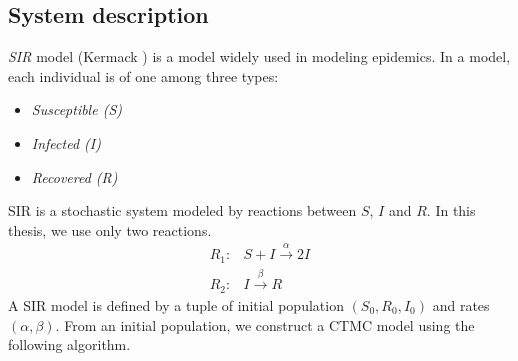 \subsection{System description}
\textit{SIR} model (Kermack \cite{kermack1927contribution}) is a model widely used in modeling
epidemics. In a  model, each individual is of one among three types:
\begin{itemize}
    \item \textit{Susceptible (S)}
    \item \textit{Infected (I)}
    \item \textit{Recovered (R)}
\end{itemize}
SIR is a stochastic system modeled by reactions between $S$, $I$ and $R$. In this thesis, we use
only two reactions.
\begin{align*}
    R_1: & S + I \xrightarrow{\alpha} 2I \\
    R_2: & I     \xrightarrow{\beta} R
\end{align*}
A SIR model is defined by a tuple of initial population $(S_0, R_0, I_0)$ and rates $(\alpha,
    \beta)$. From an initial population, we construct a CTMC model using the following algorithm.
